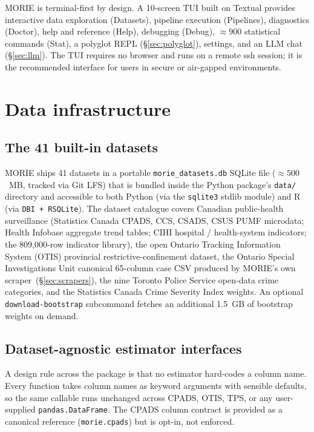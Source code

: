 \documentclass[11pt,a4paper]{article}
\theoremstyle{plain}
\theoremstyle{definition}
\theoremstyle{remark}
\begin{document}
MORIE is terminal-first by design. A 10-screen TUI built on
Textual provides interactive data exploration (Datasets), pipeline
execution (Pipelines), diagnostics (Doctor), help and reference
(Help), debugging (Debug), $\approx 900$ statistical commands
(Stat), a polyglot REPL (\S\ref{sec:polyglot}), settings, and an
LLM chat (\S\ref{sec:llm}). The TUI requires no browser and runs
on a remote ssh session; it is the recommended interface for users
in secure or air-gapped environments.

\section{Data infrastructure}
\label{sec:data}

\subsection{The 41 built-in datasets}

MORIE ships 41 datasets in a portable
\texttt{morie\_datasets.db} SQLite file ($\approx 500$~MB,
tracked via Git LFS) that is bundled inside the Python package's
\texttt{data/} directory and accessible to both Python (via the
\texttt{sqlite3} stdlib module) and R (via \texttt{DBI +
RSQLite}). The dataset catalogue covers Canadian public-health
surveillance (Statistics Canada CPADS, CCS, CSADS, CSUS PUMF
microdata; Health Infobase aggregate trend tables; CIHI hospital /
health-system indicators; the 809{,}000-row indicator library), the
open Ontario Tracking Information System (OTIS) provincial
restrictive-confinement dataset, the Ontario Special Investigations
Unit canonical 65-column case CSV produced by MORIE's own
scraper~(\S\ref{sec:scrapers}), the nine Toronto Police Service
open-data crime categories, and the Statistics Canada Crime
Severity Index weights. An optional \texttt{download-bootstrap}
subcommand fetches an additional 1.5~GB of bootstrap weights
on demand.

\subsection{Dataset-agnostic estimator interfaces}

A design rule across the package is that no estimator hard-codes
a column name. Every function takes column names as keyword
arguments with sensible defaults, so the same callable runs
unchanged across CPADS, OTIS, TPS, or any user-supplied
\texttt{pandas.DataFrame}. The CPADS column contract is provided
as a canonical reference (\texttt{morie.cpads}) but is opt-in,
not enforced.
\end{document}

